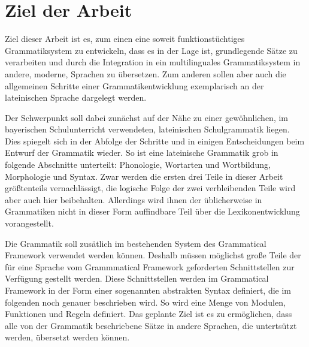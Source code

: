 \section{Ziel der Arbeit}
\label{sec:ziel}
Ziel dieser Arbeit ist es, zum einen eine soweit funktionstüchtiges Grammatiksystem zu entwickeln, dass es in der Lage ist, grundlegende Sätze zu verarbeiten und durch die Integration in ein multilinguales Grammatiksystem in andere, moderne, Sprachen zu übersetzen. Zum anderen sollen aber auch die allgemeinen Schritte einer Grammatikentwicklung exemplarisch an der lateinischen Sprache dargelegt werden. \par
Der Schwerpunkt soll dabei zunächst auf der Nähe zu einer gewöhnlichen, im bayerischen Schulunterricht verwendeten, lateinischen Schulgrammatik liegen. Dies spiegelt sich in der Abfolge der Schritte und in einigen Entscheidungen beim Entwurf der Grammatik wieder. So ist eine lateinische Grammatik grob in folgende Abschnitte unterteilt: Phonologie, Wortarten und Wortbildung, Morphologie und Syntax. Zwar werden die ersten drei Teile in dieser Arbeit größtenteils vernachlässigt, die logische Folge der zwei verbleibenden Teile wird aber auch hier beibehalten. Allerdings wird ihnen der üblicherweise in Grammatiken nicht in dieser Form auffindbare Teil über die Lexikonentwicklung vorangestellt. \par
Die Grammatik soll zusätlich im bestehenden System des Grammatical Framework verwendet werden können. Deshalb müssen möglichst große Teile der für eine Sprache vom Grammmatical Framework geforderten Schnittstellen zur Verfügung gestellt werden. Diese Schnittstellen werden im Grammatical Framework in der Form einer sogenannten abstrakten Syntax definiert, die im folgenden noch genauer beschrieben wird. So wird eine Menge von Modulen, Funktionen und Regeln definiert. Das geplante Ziel ist es zu ermöglichen, dass alle von der Grammatik beschriebene Sätze in andere Sprachen, die untertsützt werden, übersetzt werden können.
\pagebreak
